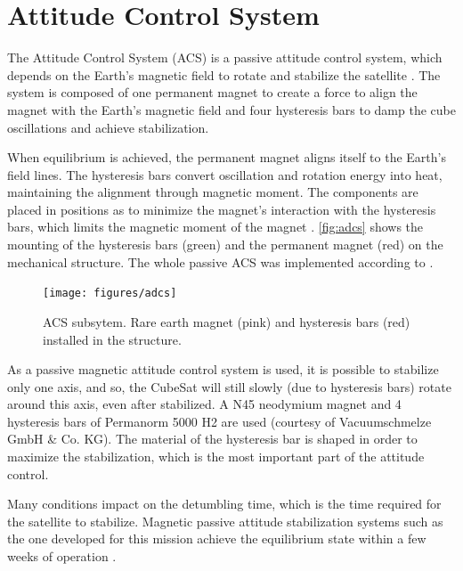 \section{Attitude Control System}

The Attitude Control System (ACS) is a passive attitude control system, which depends on the Earth's magnetic field to rotate and stabilize the satellite \cite{santoni2009,gerhardt2010}. The system is composed of one permanent magnet to create a force to align the magnet with the Earth's magnetic field and four hysteresis bars to damp the cube oscillations and achieve stabilization.

When equilibrium is achieved, the permanent magnet aligns itself to the Earth's field lines. The hysteresis bars convert oscillation and rotation energy into heat, maintaining the alignment through magnetic moment. The components are placed in positions as to minimize the magnet's interaction with the hysteresis bars, which limits the magnetic moment of the magnet \cite{francois2010}. \autoref{fig:adcs} shows the mounting of the hysteresis bars (green) and the permanent magnet (red) on the mechanical structure. The whole passive ACS was implemented according to \cite{francois2010}.

\begin{figure}[!ht]
    \begin{center}
        \texttt{[image: figures/adcs]}
        \caption{ACS subsytem. Rare earth magnet (pink) and hysteresis bars (red) installed in the structure.}
        \label{fig:adcs}
    \end{center}
\end{figure}

As a passive magnetic attitude control system is used, it is possible to stabilize only one axis, and so, the CubeSat will still slowly (due to hysteresis bars) rotate around this axis, even after stabilized. A N45 neodymium magnet and 4 hysteresis bars of Permanorm 5000 H2 are used (courtesy of Vacuumschmelze GmbH \& Co. KG). The material of the hysteresis bar is shaped in order to maximize the stabilization, which is the most important part of the attitude control.

Many conditions impact on the detumbling time, which is the time required for the satellite to stabilize. Magnetic passive attitude stabilization systems such as the one developed for this mission achieve the equilibrium state within a few weeks of operation \cite{santoni2009}.

